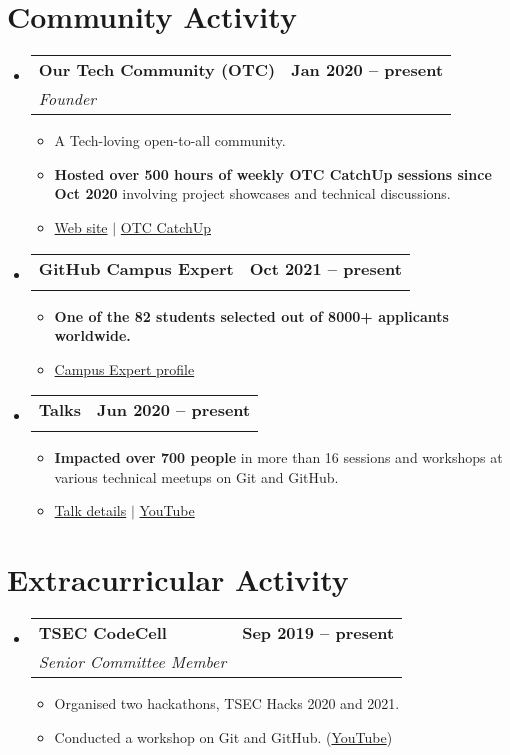 \documentclass[letterpaper,11pt]{article}
\makeatletter
\newcommand{\resumeItem}[1]{
  \item\small{
    {#1 \vspace{-2pt}}
  }
}
\newcommand{\resumeSubheading}[4]{
  \vspace{-2pt}\item
    \begin{tabular*}{1.0\textwidth}[t]{l@{\extracolsep{\fill}}r}
      \vspace{-2pt}\textbf{#1} & \textbf{\small #2} \\
      \textit{\small#3} & \textit{\small #4} \\
    \end{tabular*}\vspace{-7pt}
}
\newcommand{\resumeSubHeadingListStart}{\begin{itemize}[leftmargin=0.0in, label={}]}
\newcommand{\resumeSubHeadingListEnd}{\end{itemize}}
\newcommand{\resumeItemListStart}{\begin{itemize}}
\newcommand{\resumeItemListEnd}{\end{itemize}\vspace{-5pt}}
\makeatother
\begin{document}
\section{Community Activity}
    \resumeSubHeadingListStart
        \resumeSubheading
            {Our Tech Community (OTC)}{Jan 2020 -- present}
            {Founder}{}
            \vspace{-7pt}
            \resumeItemListStart
                \resumeItem{A Tech-loving open-to-all community.}
                \resumeItem{\textbf{Hosted over 500 hours of weekly OTC CatchUp sessions since Oct 2020} involving project showcases and technical discussions.}
                \resumeItem{\href{https://ourtech.community}{Web site} $|$ \href{https://catchup.ourtech.community}{OTC CatchUp}}
            \resumeItemListEnd
        \vspace{-2pt}

        \resumeSubheading
            {GitHub Campus Expert}{Oct 2021 -- present}
            {}{}
            \vspace{-18pt}
            \resumeItemListStart
                \resumeItem{\textbf{One of the 82 students selected out of 8000+ applicants worldwide.}}
                \resumeItem{\href{https://githubcampus.expert/HarshKapadia2}{Campus Expert profile}}
            \resumeItemListEnd
        \vspace{-4pt}

        \resumeSubheading
            {Talks}{Jun 2020 -- present}
            {}{}
            \vspace{-18pt}
            \resumeItemListStart
                \resumeItem{\textbf{Impacted over 700 people} in more than 16 sessions and workshops at various technical meetups on Git and GitHub.}
                \resumeItem{\href{https://talks.harshkapadia.me}{Talk details} $|$ \href{https://www.youtube.com/HarshKapadia}{YouTube}}
            \resumeItemListEnd
    \resumeSubHeadingListEnd
\vspace{-19pt}


\section{Extracurricular Activity}
    \resumeSubHeadingListStart
        \resumeSubheading
            {TSEC CodeCell}{Sep 2019 -- present}
            {Senior Committee Member}{}
            \resumeItemListStart
                \resumeItem{Organised two hackathons, TSEC Hacks 2020 and 2021.}
                \resumeItem{Conducted a workshop on Git and GitHub. (\href{https://www.youtube.com/watch?v=ArOKEf8nkfw}{YouTube})}
            \resumeItemListEnd
    \resumeSubHeadingListEnd
\vspace{-8pt}
\end{document}
